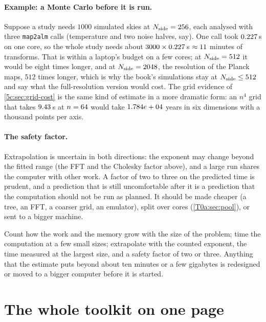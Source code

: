 \paragraph{Example: a Monte Carlo before it is run.} Suppose a study needs $1000$ simulated skies at $N_{\rm side}=256$, each analysed with three \texttt{map2alm} calls (temperature and two noise halves, say). One call took $0.227$\,s on one core, so the whole study needs about $3000\times0.227$\,s $\approx\TzMcMinutes$ minutes of transforms. That is within a laptop's budget on a few cores; at $N_{\rm side}=512$ it would be eight times longer, and at $N_{\rm side}=2048$, the resolution of the Planck maps, $512$ times longer, which is why the book's simulations stay at $N_{\rm side}\le512$ and say what the full-resolution version would cost. The grid evidence of \cref{5c:sec:grid-cost} is the same kind of estimate in a more dramatic form: an $n^4$ grid that takes $9.43$\,s at $n=64$ would take $1.784e+04$ years in six dimensions with a thousand points per axis.

\paragraph{The safety factor.} Extrapolation is uncertain in both directions: the exponent may change beyond the fitted range (the FFT and the Cholesky factor above), and a large run shares the computer with other work. A factor of two to three on the predicted time is prudent, and a prediction that is still uncomfortable after it is a prediction that the computation should not be run as planned. It should be made cheaper (a tree, an FFT, a coarser grid, an emulator), split over cores (\cref{T0a:sec:pool}), or sent to a bigger machine.

\begin{keyidea}
Count how the work and the memory grow with the size of the problem; time the computation at a few small sizes; extrapolate with the counted exponent, the time measured at the largest size, and a safety factor of two or three. Anything that the estimate puts beyond about ten minutes or a few gigabytes is redesigned or moved to a bigger computer before it is started.
\end{keyidea}
\section{The whole toolkit on one page}
\label{T0a:sec:cheat}

